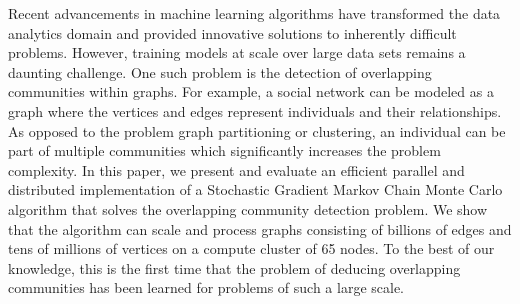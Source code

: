 %
Recent advancements in machine learning algorithms have transformed the data
analytics domain and provided innovative solutions to inherently difficult
problems. However, training models at scale over large data sets remains a
daunting challenge. One such problem is the detection of overlapping
communities within graphs. For example, a social network can be modeled as a
graph where the vertices and edges represent individuals and their
relationships. As opposed to the problem graph partitioning or clustering, an
individual can be part of multiple communities which significantly increases
the problem complexity.
In this paper, we present and evaluate an efficient parallel and
distributed implementation of a Stochastic Gradient Markov Chain Monte Carlo
algorithm that solves the overlapping community detection problem. We show that
the algorithm can scale and process graphs consisting of billions of edges and
tens of millions of vertices on a compute cluster of 65 nodes. To the best of
our knowledge, this is the first time that the problem of deducing overlapping
communities has been learned for problems of such a large scale.

